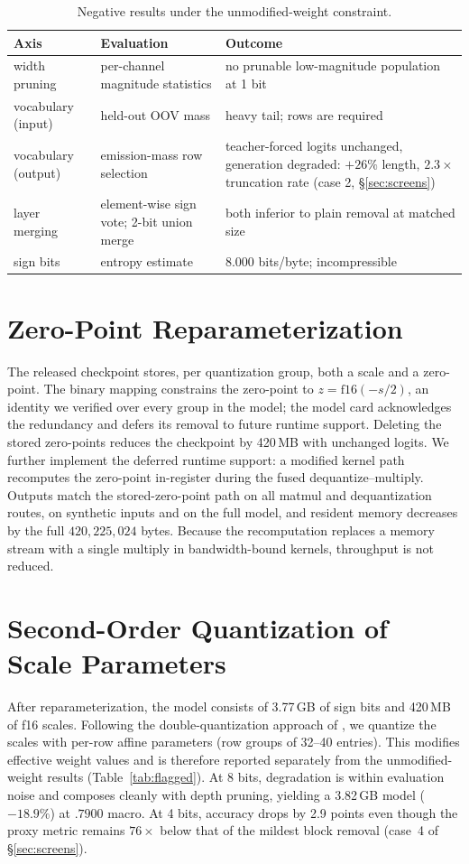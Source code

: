 \documentclass[10pt]{article}
\begin{document}
\begin{table}[h]
\centering\small
\begin{tabular}{p{}p{}p{}}
\toprule
Axis & Evaluation & Outcome \\
\midrule
width pruning & per-channel magnitude statistics & no prunable low-magnitude population at 1 bit \\
vocabulary (input) & held-out OOV mass & heavy tail; rows are required \\
vocabulary (output) & emission-mass row selection & teacher-forced logits unchanged, generation degraded: $+26\%$ length, $2.3\times$ truncation rate (case 2, \S\ref{sec:screens}) \\
layer merging & element-wise sign vote; 2-bit union merge & both inferior to plain removal at matched size \\
sign bits & entropy estimate & 8.000 bits/byte; incompressible \\
\bottomrule
\end{tabular}
\caption{Negative results under the unmodified-weight constraint.}
\label{tab:neg}
\end{table}

\section{Zero-Point Reparameterization}
\label{sec:format}
The released checkpoint stores, per quantization group, both a scale and a zero-point. The binary mapping constrains the zero-point to $z=\mathrm{f16}(-s/2)$, an identity we verified over every group in the model; the model card acknowledges the redundancy and defers its removal to future runtime support. Deleting the stored zero-points reduces the checkpoint by 420\,MB with unchanged logits. We further implement the deferred runtime support: a modified kernel path recomputes the zero-point in-register during the fused dequantize--multiply. Outputs match the stored-zero-point path on all matmul and dequantization routes, on synthetic inputs and on the full model, and resident memory decreases by the full $420{,}225{,}024$ bytes. Because the recomputation replaces a memory stream with a single multiply in bandwidth-bound kernels, throughput is not reduced.

\section{Second-Order Quantization of Scale Parameters}
\label{sec:flagged}
After reparameterization, the model consists of 3.77\,GB of sign bits and 420\,MB of f16 scales. Following the double-quantization approach of \citet{qlora}, we quantize the scales with per-row affine parameters (row groups of 32--40 entries). This modifies effective weight values and is therefore reported separately from the unmodified-weight results (Table~\ref{tab:flagged}). At 8 bits, degradation is within evaluation noise and composes cleanly with depth pruning, yielding a 3.82\,GB model ($-18.9\%$) at $.7900$ macro. At 4 bits, accuracy drops by 2.9 points even though the proxy metric remains $76\times$ below that of the mildest block removal (case~4 of \S\ref{sec:screens}).
\end{document}
